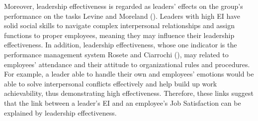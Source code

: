 \documentclass[
  man,
  longtable,
  nolmodern,
  notxfonts,
  notimes,
  colorlinks=true,linkcolor=blue,citecolor=blue,urlcolor=blue]{apa7}
\begin{document}
Moreover, leadership effectiveness is regarded as leaders' effects on
the group's performance on the tasks Levine and Moreland
(). Leaders with high EI have solid
social skills to navigate complex interpersonal relationships and assign
functions to proper employees, meaning they may influence their
leadership effectiveness. In addition, leadership effectiveness, whose
one indicator is the performance management system Rosete and Ciarrochi
(), may related to employees'
attendance and their attitude to organizational rules and procedures.
For example, a leader able to handle their own and employees' emotions
would be able to solve interpersonal conflicts effectively and help
build up work achievability, thus demonstrating high effectiveness.
Therefore, these links suggest that the link between a leader's EI and
an employee's Job Satisfaction can be explained by leadership
effectiveness.
\end{document}
